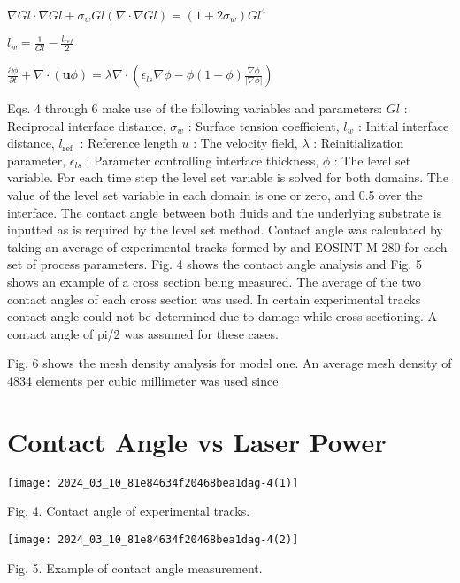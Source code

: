 \documentclass[10pt]{article}
\begin{document}
$\nabla G l \cdot \nabla G l+\sigma_{w} G l(\nabla \cdot \nabla G l)=\left(1+2 \sigma_{w}\right) G l^{4}$

$l_{w}=\frac{1}{G l}-\frac{l_{r e f}}{2}$

$\frac{\partial \phi}{\partial t}+\nabla \cdot(\boldsymbol{u} \phi)=\lambda \nabla \cdot\left(\epsilon_{l s} \nabla \phi-\phi(1-\phi) \frac{\nabla \phi}{|\nabla \phi|}\right)$

Eqs. 4 through 6 make use of the following variables and parameters: $G l$ : Reciprocal interface distance, $\sigma_{w}$ : Surface tension coefficient, $l_{w}$ : Initial interface distance, $l_{\text {ref }}$ : Reference length $u$ : The velocity field, $\lambda$ : Reinitialization parameter, $\epsilon_{l s}$ : Parameter controlling interface thickness, $\phi$ : The level set variable. For each time step the level set variable is solved for both domains. The value of the level set variable in each domain is one or zero, and 0.5 over the interface. The contact angle between both fluids and the underlying substrate is inputted as is required by the level set method. Contact angle was calculated by taking an average of experimental tracks formed by and EOSINT M 280 for each set of process parameters. Fig. 4 shows the contact angle analysis and Fig. 5 shows an example of a cross section being measured. The average of the two contact angles of each cross section was used. In certain experimental tracks contact angle could not be determined due to damage while cross sectioning. A contact angle of pi/2 was assumed for these cases.

Fig. 6 shows the mesh density analysis for model one. An average mesh density of 4834 elements per cubic millimeter was used since

\section*{Contact Angle vs Laser Power}
\begin{center}
\texttt{[image: 2024\_03\_10\_81e84634f20468bea1dag-4(1)]}
\end{center}

Fig. 4. Contact angle of experimental tracks.

\begin{center}
\texttt{[image: 2024\_03\_10\_81e84634f20468bea1dag-4(2)]}
\end{center}

Fig. 5. Example of contact angle measurement.
\end{document}
